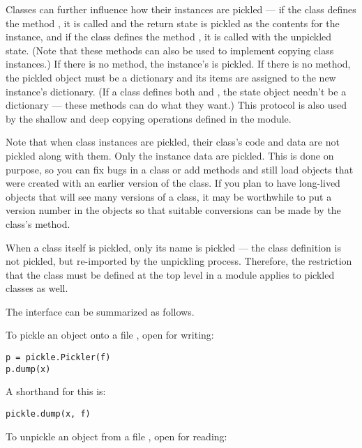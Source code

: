Classes can further influence how their instances are pickled --- if the class
defines the method , it is called and the return
state is pickled as the contents for the instance, and if the class
defines the method , it is called with the
unpickled state.  (Note that these methods can also be used to
implement copying class instances.)  If there is no
 method, the instance's  is
pickled.  If there is no  method, the pickled
object must be a dictionary and its items are assigned to the new
instance's dictionary.  (If a class defines both 
and , the state object needn't be a dictionary
--- these methods can do what they want.)  This protocol is also used
by the shallow and deep copying operations defined in the 
module.

Note that when class instances are pickled, their class's code and
data are not pickled along with them.  Only the instance data are
pickled.  This is done on purpose, so you can fix bugs in a class or
add methods and still load objects that were created with an earlier
version of the class.  If you plan to have long-lived objects that
will see many versions of a class, it may be worthwhile to put a version
number in the objects so that suitable conversions can be made by the
class's  method.

When a class itself is pickled, only its name is pickled --- the class
definition is not pickled, but re-imported by the unpickling process.
Therefore, the restriction that the class must be defined at the top
level in a module applies to pickled classes as well.

\renewcommand{\indexsubitem}{(in module pickle)}

The interface can be summarized as follows.

To pickle an object  onto a file , open for writing:

\begin{verbatim}
p = pickle.Pickler(f)
p.dump(x)
\end{verbatim}

A shorthand for this is:

\begin{verbatim}
pickle.dump(x, f)
\end{verbatim}

To unpickle an object  from a file , open for reading:

